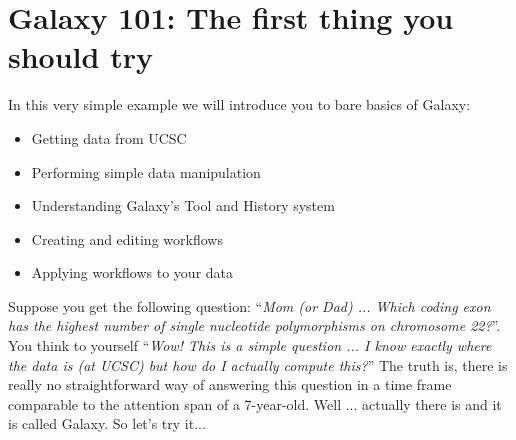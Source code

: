 \documentclass[11pt,a4paper]{article}
\begin{document}
\section*{Galaxy 101: The first thing you should try}
In this very simple example we will introduce you to bare basics of Galaxy:
\begin{itemize}
	\item Getting data from UCSC
	\item Performing simple data manipulation
	\item Understanding Galaxy's Tool and History system
	\item Creating and editing workflows
	\item Applying workflows to your data
\end{itemize}
Suppose you get the following question: ``\textit{Mom (or Dad) ... Which coding exon has the highest number of single nucleotide polymorphisms on chromosome 22?}''. You think to yourself ``\textit{Wow! This is a simple question ... I know exactly where the data is (at UCSC) but how do I actually compute this?}'' The truth is, there is really no
straightforward way of answering this question in a time frame comparable to the attention span of a 7-year-old. Well ... actually there is and it is called Galaxy. So let's try it...
\end{document}

